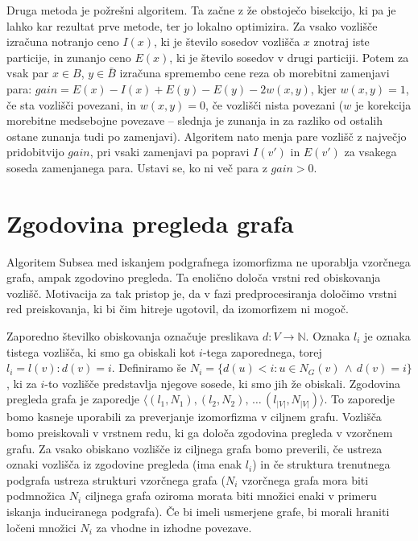 \documentclass[a4paper, 12pt, ]{book}
\newcommand{\TODO}[1]{\textcolor{red}{#1}}
\begin{document}
	Druga metoda je požrešni algoritem. Ta začne z že obstoječo bisekcijo, ki pa je lahko kar rezultat prve metode, ter jo lokalno optimizira. Za vsako vozlišče
	izračuna notranjo ceno $I(x)$, ki je število sosedov vozlišča $x$ znotraj iste particije, in zunanjo ceno $E(x)$, ki je število sosedov v drugi particiji. Potem
	za vsak par $x \in B$, $y \in \bar B$ izračuna spremembo cene reza ob morebitni zamenjavi para: $gain = E(x) - I(x) + E(y)  - E(y) - 2w(x,y)$, kjer
	$w(x,y) = 1$, če sta vozlišči povezani, in $w(x,y) = 0$, če vozlišči nista povezani ($w$ je korekcija morebitne medsebojne povezave -- slednja je zunanja
	in za razliko od ostalih ostane zunanja tudi po zamenjavi). Algoritem nato menja pare vozlišč z največjo pridobitvijo $gain$, pri vsaki zamenjavi pa
	popravi $I(v')$ in $E(v')$ za vsakega soseda zamenjanega para. Ustavi se, ko ni več para z $gain > 0$.
	
	
	
	\section{Zgodovina pregleda grafa}
	\label{sub:th}
	Algoritem Subsea med iskanjem podgrafnega izomorfizma ne uporablja vzorčnega grafa, ampak zgodovino pregleda. Ta enolično določa vrstni red
	obiskovanja vozlišč. Motivacija za tak pristop je, da v fazi predprocesiranja določimo vrstni red preiskovanja, ki bi čim hitreje ugotovil, da izomorfizem
	ni mogoč.
	
	Zaporedno številko obiskovanja označuje preslikava $d : V \to \mathbb{N}$. Oznaka $l_i$ je oznaka tistega vozlišča, ki smo ga obiskali kot $i$-tega 
	zaporednega, torej $l_i = l(v): d(v) = i$. Definiramo še $N_i = \{ d(u) < i: u \in N_G(v) \, \wedge \, d(v) = i\}$, ki za $i$-to vozlišče predstavlja
	njegove sosede, ki smo jih že obiskali. Zgodovina pregleda grafa je zaporedje $\langle (l_1, N_1), (l_2, N_2), \,\ldots\, (l_{|V|}, N_{|V|})\rangle$. To
	zaporedje bomo kasneje uporabili za preverjanje izomorfizma v ciljnem grafu. Vozlišča bomo preiskovali v vrstnem redu, ki ga določa zgodovina pregleda
	v vzorčnem grafu. Za vsako obiskano vozlišče iz ciljnega grafa bomo preverili, če ustreza oznaki vozlišča iz zgodovine pregleda (ima enak $l_i$) in če
	struktura trenutnega podgrafa ustreza strukturi vzorčnega grafa ($N_i$ vzorčnega grafa mora biti podmnožica $N_i$ ciljnega grafa oziroma morata biti
	množici enaki v primeru iskanja induciranega podgrafa). Če bi imeli usmerjene grafe, bi morali hraniti ločeni množici $N_i$ za vhodne in izhodne
	povezave.
	
\end{document}

